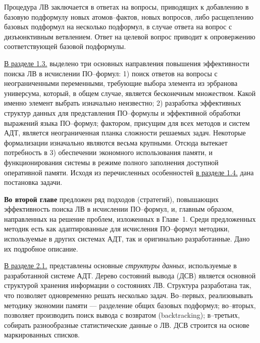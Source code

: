 \documentclass[a4paper]{report}
\begin{document}
Процедура ЛВ заключается в ответах на вопросы, приводящих к добавлению в базовую подформулу новых атомов--фактов, новых вопросов, либо расщеплению базовых подформул на несколько подформул, в случае ответа на вопрос с дизъюнктивным ветвлением. Ответ на целевой вопрос приводит к опровержению соответствующей базовой подформулы.


\underline{В разделе 1.3.} выделено три основных направления повышения эффективности поиска ЛВ в исчислении ПО--формул: 1) поиск ответов на вопросы с неограниченными переменными, требующие выбора элемента из эрбранова универсума, который, в общем случае, является бесконечным множеством. Какой именно элемент выбрать изначально неизвестно; 2) разработка эффективных структур данных для представления ПО--формулы и эффективной обработки выражений языка ПО--формул; фактором, присущим для всех методов и систем АДТ, является неограниченная планка сложности решаемых задач. Некоторые формализации изначально являются весьма крупными. Отсюда вытекает потребность в 3) обеспечении экономного использования памяти, и функционирования системы в режиме полного заполнения доступной оперативной памяти. Исходя из перечисленных особенностей \underline{в разделе 1.4.} дана постановка задачи.



\textbf{Во второй главе} предложен ряд подходов (стратегий), повышающих эффективность поиска ЛВ в исчислении ПО--формул, и, главным образом, направленных на решение проблем, изложенных в Главе~1. Среди предложенных методик есть как адаптированные для исчисления ПО--формул методики, используемые в других системах АДТ, так и оригинально разработанные. Дано их подробное описание.

\underline{В разделе 2.1.} представлены основные \emph{структуры данных}, используемые в разработанной системе АДТ. Дерево состояний вывода (ДСВ) является основной структурой хранения информации о состояниях ЛВ. Структура разработана так, что позволяет одновременно решать несколько задач. Во--первых, реализовывать методику экономии памяти --- разделение общих базовых подформул; во--вторых, позволяет производить поиск вывода с возвратом (backtracking); в--третьих, собирать разнообразные статистические данные о ЛВ. ДСВ строится на основе маркированных списков.
\end{document}

